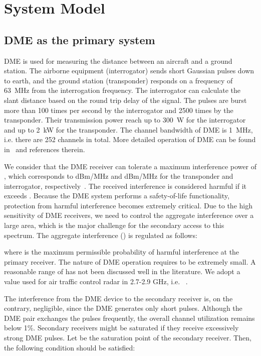 \documentclass[12pt,submission,journal,onecolumn]{IEEEtran}
\begin{document}
\section{System Model}
\label{sec:SystemModel}

\subsection{DME as the primary system}
\label{sec:DME}
DME is used for measuring the distance between an aircraft and a ground station. The airborne equipment (interrogator) sends short Gaussian pulses down to earth, and the ground station (transponder) responds on a frequency of 63~MHz from the interrogation frequency. The interrogator can calculate the slant distance based on the round trip delay of the signal. The pulses are burst more than 100 times per second by the interrogator and 2500 times by the transponder. Their transmission power reach up to 300~W for the interrogator and up to 2~kW for the transponder. The channel bandwidth of DME is 1~MHz, i.e. there are 252 channels in total. More detailed operation of DME can be found in~\cite{5936226} and references therein.

We consider that the DME receiver can tolerate a maximum interference power of , which corresponds to dBm/MHz and dBm/MHz for the transponder and interrogator, respectively~\cite{5936226}. The received interference is considered harmful if it exceeds .
Because the DME system performs a safety-of-life functionality, protection from harmful interference becomes extremely critical. Due to the high sensitivity of DME receivers, we need to control the aggregate interference over a large area, which is the major challenge for the secondary access to this spectrum. The aggregate interference () is regulated as follows:

where  is the maximum permissible probability of harmful interference at the primary receiver. The nature of DME operation requires  to be extremely small. A reasonable range of  has not been discussed well in the literature. We adopt a value used for air traffic control radar in 2.7-2.9 GHz, i.e. ~\cite{ImadurPIRMC}.

The interference from the DME device to the secondary receiver is, on the contrary, negligible, since the DME generates only short pulses. Although the DME pair exchanges the pulses frequently, the overall channel utilization remains below 1\%. Secondary receivers might be saturated if they receive excessively strong DME pulses.  Let  be the saturation point of the secondary receiver. Then, the following condition should be satisfied:
\end{document}

